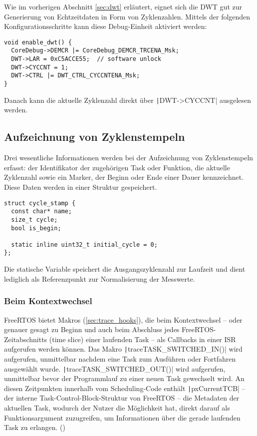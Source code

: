 Wie im vorherigen Abschnitt \ref{sec:dwt} erläutert, eignet sich die DWT gut zur
Generierung von Echtzeitdaten in Form von Zyklenzahlen. Mittels der folgenden
Konfigurationsschritte kann diese Debug-Einheit aktiviert werden:

\begin{code}
\begin{verbatim}
void enable_dwt() {
  CoreDebug->DEMCR |= CoreDebug_DEMCR_TRCENA_Msk;
  DWT->LAR = 0xC5ACCE55;  // software unlock
  DWT->CYCCNT = 1;
  DWT->CTRL |= DWT_CTRL_CYCCNTENA_Msk;
}
\end{verbatim}
\end{code}

Danach kann die aktuelle Zyklenzahl direkt über \texttt|DWT->CYCCNT|
ausgelesen werden.

\subsection{Aufzeichnung von Zyklenstempeln}

Drei wesentliche Informationen werden bei der Aufzeichnung von Zyklenstempeln
erfasst: der Identifikator der zugehörigen Task oder Funktion, die aktuelle
Zyklenzahl sowie ein Marker, der Beginn oder Ende einer Dauer kennzeichnet.
Diese Daten werden in einer Struktur gespeichert.

\begin{code}
\begin{verbatim}
struct cycle_stamp {
  const char* name;
  size_t cycle;
  bool is_begin;

  static inline uint32_t initial_cycle = 0;
};
\end{verbatim}
\end{code}

Die statische Variable speichert die Ausgangszyklenzahl zur Laufzeit und dient
lediglich als Referenzpunkt zur Normalisierung der Messwerte.

\subsubsection{Beim Kontextwechsel}

FreeRTOS bietet Makros (\ref{sec:trace_hooks}), die beim Kontextwechsel -- oder
genauer gesagt zu Beginn und auch beim Abschluss jedes FreeRTOS-Zeitabschnitts
(time slice) einer laufenden Task -- als Callbacks in einer ISR aufgerufen
werden können. Das Makro \texttt|traceTASK_SWITCHED_IN()| wird
aufgerufen, unmittelbar nachdem eine Task zum Ausführen oder Fortfahren
ausgewählt wurde. \texttt|traceTASK_SWITCHED_OUT()| wird aufgerufen,
unmittelbar bevor der Programmlauf zu einer neuen Task gewechselt wird. An
diesen Zeitpunkten innerhalb vom Scheduling-Code enthält
\texttt|pxCurrentTCB| -- der interne Task-Control-Block-Struktur von
FreeRTOS -- die Metadaten der aktuellen Task, wodurch der Nutzer die Möglichkeit
hat, direkt darauf als Funktionsargument zuzugreifen, um Informationen über die
gerade laufenden Task zu erlangen. (\cite{freertos_rtos_trace_hooks})

